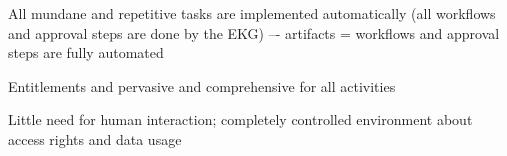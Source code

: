 \kgmmscoringlevelFive

\begin{scoring}

  \item All mundane and repetitive tasks are implemented automatically
        (all workflows and approval steps are done by the EKG) –- artifacts = workflows and
        approval steps are fully automated
  \item Entitlements and pervasive and comprehensive for all activities
  \item Little need for human interaction; completely controlled environment about access rights and data usage

\end{scoring}
